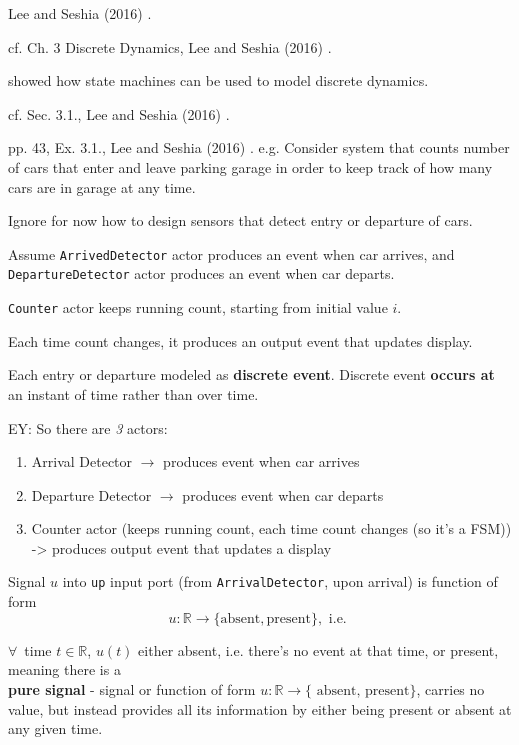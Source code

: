 \documentclass[10pt]{amsart}
\begin{document}
Lee and Seshia (2016) \cite{LeSe2016}.

cf. Ch. 3 Discrete Dynamics, Lee and Seshia (2016) \cite{LeSe2016}. 

showed how state machines can be used to model discrete dynamics.

cf. Sec. 3.1., Lee and Seshia (2016) \cite{LeSe2016}. 

pp. 43, Ex. 3.1., Lee and Seshia (2016) \cite{LeSe2016}. e.g. Consider system that counts number of cars that enter and leave parking garage in order to keep track of how many cars are in garage at any time. 

Ignore for now how to design sensors that detect entry or departure of cars.

Assume \texttt{ArrivedDetector} actor produces an event when car arrives, and \texttt{DepartureDetector} actor produces an event when car departs.

\texttt{Counter} actor keeps running count, starting from initial value $i$. 

Each time count changes, it produces an output event that updates display.

Each entry or departure modeled as \textbf{discrete event}. Discrete event \textbf{occurs at} an instant of time rather than over time.

EY: So there are \emph{3} actors:

\begin{enumerate}
	\item Arrival Detector $\to$ produces event when car arrives
	\item Departure Detector $\to$ produces event when car departs
	\item Counter actor (keeps running count, each time count changes (so it's a FSM)) -> produces output event that updates a display
\end{enumerate}


Signal $u$ into \texttt{up} input port (from \texttt{ArrivalDetector}, upon arrival) is function of form
\[
u : \mathbb{R} \to \lbrace \text{absent}, \text{present} \rbrace, \text{ i.e. }
\]

$\forall \, $ time $t\in \mathbb{R}$, $u(t) $ either absent, i.e. there's no event at that time, or present, meaning there is a \\

\textbf{pure signal} - signal or function of form $u:\mathbb{R} \to \lbrace \text{ absent, present} \rbrace$, carries no value, but instead provides all its information by either being present or absent at any given time. \\
\end{document}

